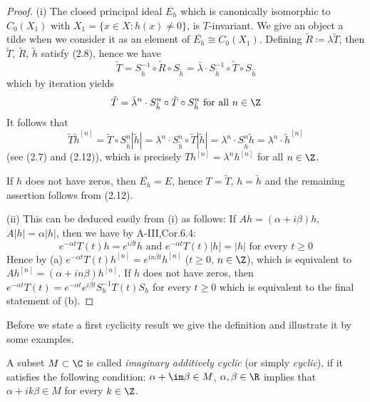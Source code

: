 \begin{proof}
	(i) The closed principal ideal $\overline{E_{h}}$ which is canonically isomorphic to $C_{0}(X_{1})$ with $X_{1} = \{x \in X \colon h(x) \neq 0\}$, is $T$-invariant.
	We give an object a tilde when we consider it as an element of $\overline{E_{h}} \cong C_{0}(X_{1})$.
	Defining $\tilde{R} \coloneqq \lambda\tilde{T}$, then $\tilde{T}$, $\tilde{R}$, $\tilde{h}$ satisfy (2.8), hence we have
	\begin{equation}\label{eq:b3-2.12}
		\tilde{T} = S_{\tilde{h}}^{-1} \circ \tilde{R} \circ S_{\tilde{h}} = \bar{\lambda} \cdot S_{\tilde{h}}^{-1} \circ \tilde{T} \circ S_{\tilde{h}}
	\end{equation}
	which by iteration yields
	\begin{equation}\label{eq:b3-2.13}
		\tilde{T} = \bar{\lambda}^{n} \cdot S_{\tilde{h}}^{n} \circ \tilde{T} \circ S_{\tilde{h}}^{n} \text{ for all } n \in \Z
	\end{equation}
	It follows that
		\begin{equation*}
		\tilde{T}\tilde{h}^{[n]} = \tilde{T} \circ S_{\tilde{h}}^{n}|\tilde{h}| = \lambda^{n} \cdot S_{\tilde{h}}^{n} \circ \tilde{T}|\tilde{h}| 
		= \lambda^{n} \cdot S_{\tilde{h}}^{n}\tilde{h} = \lambda^{n} \cdot \tilde{h}^{[n]}
	\end{equation*}
	(see (2.7) and (2.12)), which is precisely $Th^{[n]} = \lambda^{n}h^{[n]}$ for all $n \in \Z$.
	
	If $h$ does not have zeros, then $\overline{E_{h}} = E$, hence $T = \tilde{T}$, $h = \tilde{h}$ and the remaining assertion follows from (2.12).
		
	(ii) This can be deduced easily from (i) as follows: 
	If $Ah = (\alpha+i\beta)h$, $A|h| = \alpha|h|$, then we have by A-III,Cor.6.4:
	\[
	e^{-\alpha t}T(t)h = e^{i\beta t}h \text{ and } e^{-\alpha t}T(t)|h| = |h| \text{ for every } t \geq 0
	\]
	Hence by (a) $e^{-\alpha t}T(t)h^{[n]} = e^{in\beta t}h^{[n]}$ ($t \geq 0$, $n \in \Z$), which is equivalent to $Ah^{[n]} = (\alpha+in\beta)h^{[n]}$.
	If $h$ does not have zeros, then $e^{-\alpha t}T(t) = e^{-\alpha t}e^{i\beta t}S_{h}^{-1}T(t)S_{h}$ for every $t \geq 0$ which is equivalent to the final statement of (b).
	\end{proof}
Before we state a first cyclicity result we give the definition and illustrate it by some examples.
\begin{definition}\label{def:b3-2.5}
		
A subset $M \subset \C$ is called \emph{imaginary additively cyclic} (or simply \emph{cyclic}), if it satisfies the following condition: 
$\alpha + \im\beta \in M$, $\alpha,\beta \in \R$ implies that $\alpha + ik\beta \in M$ for every $k \in \Z$.
	\end{definition}
	
